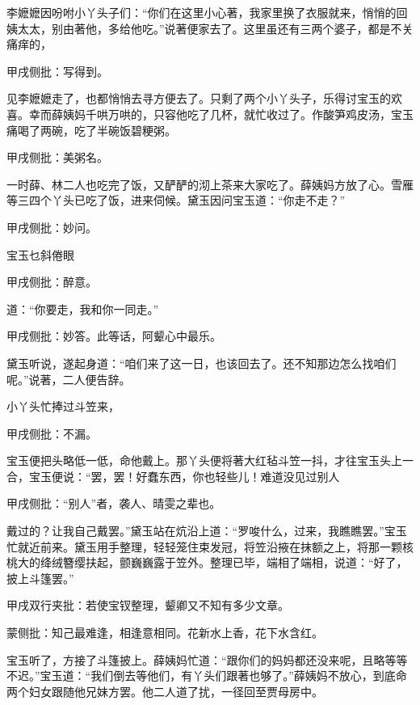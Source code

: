 \begin{parag}
    李嬷嬷因吩咐小丫头子们：“你们在这里小心著，我家里换了衣服就来，悄悄的回姨太太，别由著他，多给他吃。”说著便家去了。这里虽还有三两个婆子，都是不关痛痒的，\begin{note}甲戌侧批：写得到。\end{note}见李嬷嬷走了，也都悄悄去寻方便去了。只剩了两个小丫头子，乐得讨宝玉的欢喜。幸而薛姨妈千哄万哄的，只容他吃了几杯，就忙收过了。作酸笋鸡皮汤，宝玉痛喝了两碗，吃了半碗饭碧粳粥。\begin{note}甲戌侧批：美粥名。\end{note}一时薛、林二人也吃完了饭，又酽酽的沏上茶来大家吃了。薛姨妈方放了心。雪雁等三四个丫头已吃了饭，进来伺候。黛玉因问宝玉道：“你走不走？”\begin{note}甲戌侧批：妙问。\end{note}宝玉乜斜倦眼\begin{note}甲戌侧批：醉意。\end{note}道：“你要走，我和你一同走。”\begin{note}甲戌侧批：妙答。此等话，阿颦心中最乐。\end{note}黛玉听说，遂起身道：“咱们来了这一日，也该回去了。还不知那边怎么找咱们呢。”说著，二人便告辞。
\end{parag}


\begin{parag}
    小丫头忙捧过斗笠来，\begin{note}甲戌侧批：不漏。\end{note}宝玉便把头略低一低，命他戴上。那丫头便将著大红毡斗笠一抖，才往宝玉头上一合，宝玉便说：“罢，罢！好蠢东西，你也轻些儿！难道没见过别人\begin{note}甲戌侧批：“别人”者，袭人、晴雯之辈也。\end{note}戴过的？让我自己戴罢。”黛玉站在炕沿上道：“罗唆什么，过来，我瞧瞧罢。”宝玉忙就近前来。黛玉用手整理，轻轻笼住束发冠，将笠沿掖在抹额之上，将那一颗核桃大的绛绒簪缨扶起，颤巍巍露于笠外。整理已毕，端相了端相，说道：“好了，披上斗篷罢。”\begin{note}甲戌双行夹批：若使宝钗整理，颦卿又不知有多少文章。\end{note}\begin{note}蒙侧批：知己最难逢，相逢意相同。花新水上香，花下水含红。\end{note}宝玉听了，方接了斗篷披上。薛姨妈忙道：“跟你们的妈妈都还没来呢，且略等等不迟。”宝玉道：“我们倒去等他们，有丫头们跟著也够了。”薛姨妈不放心，到底命两个妇女跟随他兄妹方罢。他二人道了扰，一径回至贾母房中。
\end{parag}


